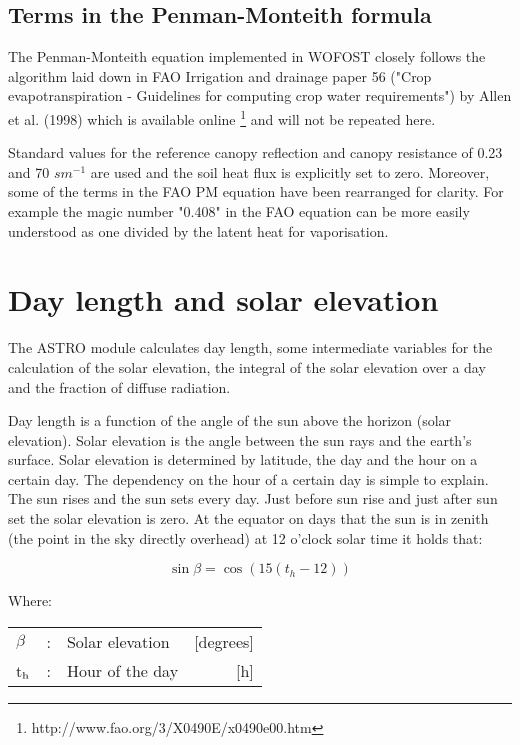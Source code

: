 \subsection{Terms in the Penman-Monteith formula}
\label{sec:PMRef}

The Penman-Monteith equation implemented in WOFOST closely follows the algorithm laid down in 
FAO Irrigation and drainage paper 56 ("Crop evapotranspiration - Guidelines for computing crop 
water requirements") by Allen et al. (1998) which is available online \footnote{http://www.fao.org/3/X0490E/x0490e00.htm}
and will not be repeated here.

Standard values for the reference canopy reflection and canopy resistance of 0.23 and 70 $s m^{-1}$ are used and
the soil heat flux is explicitly set to zero. Moreover, some of the terms in the FAO PM equation have been
rearranged for clarity. For example the magic number "0.408" in the FAO equation can be more easily 
understood as one divided by the latent heat for vaporisation.


\section{Day length and solar elevation}
\label{sec:daylength}

The ASTRO module calculates day length, some intermediate variables for the calculation
of the solar elevation, the integral of the solar elevation over a day and the fraction of
diffuse radiation.

Day length is a function of the angle of the sun above the horizon (solar elevation). Solar
elevation is the angle between the sun rays and the earth's surface. Solar elevation is
determined by latitude, the day and the hour on a certain day.
The dependency on the hour of a certain day is simple to explain. The sun rises and the
sun sets every day. Just before sun rise and just after sun set the solar elevation is zero. 
At the equator on days that the sun is in zenith (the point in the sky directly overhead) at 
12 o'clock solar time it holds that:

\begin{equation}
\sin \beta = \cos (15(t _{h} -12))
\end{equation}

Where:\\[5pt]
\begin{tabularx}{\textwidth}{llXr}
	$\beta$ &:& Solar elevation  & [degrees]\\
	t$_{{\rm h}}$ &:& Hour of the day  & [h]\\
\end{tabularx}

